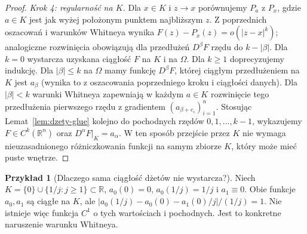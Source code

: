 \documentclass[11pt,a4paper,oneside]{book}
\numberwithin{equation}{chapter}
\theoremstyle{plain}
\theoremstyle{definition}
\newtheorem{przyklad}[twierdzenie]{Przykład}
\theoremstyle{remark}
\begin{document}
\begin{proof}
\emph{Krok 4: regularność na $K$.}
Dla $x\in K$ i $z\to x$ porównujemy $P_a$ z $P_x$,
gdzie $a\in K$ jest jak wyżej położonym punktem najbliższym
$z$. Z poprzednich oszacowań i warunków Whitneya wynika
$F(z)-P_x(z)=o(|z-x|^k)$; analogiczne rozwinięcia
obowiązują dla przedłużeń $D^\beta F$ rzędu do
$k-|\beta|$. Dla $k=0$ wystarcza uzyskana ciągłość $F$ na $K$
i na $\Omega$. Dla $k\ge1$ doprecyzujemy indukcję.
Dla
$|\beta|\le k$ na $\Omega$ mamy funkcję
$D^\beta F$, której ciągłym przedłużeniem na $K$
jest $a_\beta$ (wynika to z oszacowania poprzedniego
kroku i ciągłości danych). Dla $|\beta|<k$ warunki
Whitneya zapewniają w każdym $a\in K$ rozwinięcie
tego przedłużenia pierwszego rzędu z gradientem
$(a_{\beta+e_i})_{i=1}^n$. Stosując
Lemat~\ref{lem:dzety-glue} kolejno do pochodnych
rzędów $0,1,\ldots,k-1$, wykazujemy
$F\in C^k(\mathbb R^n)$ oraz $D^\alpha F|_K=a_\alpha$.
W ten sposób przejście przez $K$ nie wymaga
nieuzasadnionego różniczkowania funkcji na samym zbiorze
$K$, który może mieć puste wnętrze.
\end{proof}

\begin{przyklad}[Dlaczego sama ciągłość dżetów nie wystarcza?]
Niech $K=\{0\}\cup\{1/j:j\ge1\}\subset\mathbb R$,
$a_0(0)=0$, $a_0(1/j)=1/j$ i $a_1\equiv0$.
Obie funkcje $a_0,a_1$ są ciągłe na $K$, ale
$|a_0(1/j)-a_0(0)-a_1(0)/j|/(1/j)=1$.
Nie istnieje więc funkcja $C^1$ o tych wartościach i
pochodnych. Jest to konkretne naruszenie warunku Whitneya.
\end{przyklad}
\end{document}
